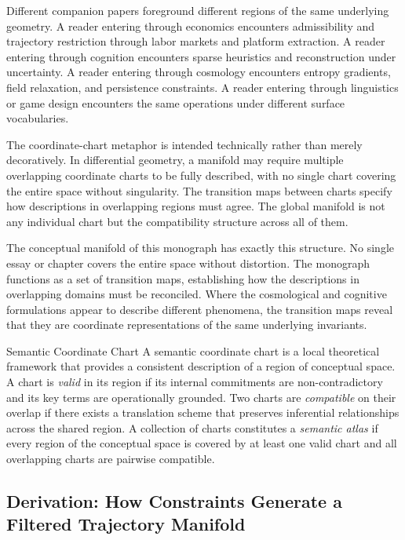 Different companion papers foreground different regions of the same underlying geometry.
A reader entering through economics encounters admissibility and trajectory restriction
through labor markets and platform extraction. A reader entering through cognition
encounters sparse heuristics and reconstruction under uncertainty. A reader entering
through cosmology encounters entropy gradients, field relaxation, and persistence
constraints. A reader entering through linguistics or game design encounters the same
operations under different surface vocabularies.

The coordinate-chart metaphor is intended technically rather than merely decoratively.
In differential geometry, a manifold may require multiple overlapping coordinate charts
to be fully described, with no single chart covering the entire space without singularity.
The transition maps between charts specify how descriptions in overlapping regions must
agree. The global manifold is not any individual chart but the compatibility structure
across all of them.

The conceptual manifold of this monograph has exactly this structure. No single essay or
chapter covers the entire space without distortion. The monograph functions as a set of
transition maps, establishing how the descriptions in overlapping domains must be
reconciled. Where the cosmological and cognitive formulations appear to describe
different phenomena, the transition maps reveal that they are coordinate representations
of the same underlying invariants.

\begin{definition}{Semantic Coordinate Chart}
A semantic coordinate chart is a local theoretical framework that provides a consistent
description of a region of conceptual space. A chart is \emph{valid} in its region if
its internal commitments are non-contradictory and its key terms are operationally
grounded. Two charts are \emph{compatible} on their overlap if there exists a
translation scheme that preserves inferential relationships across the shared region.
A collection of charts constitutes a \emph{semantic atlas} if every region of the
conceptual space is covered by at least one valid chart and all overlapping charts are
pairwise compatible.
\end{definition}

\subsection*{Derivation: How Constraints Generate a Filtered Trajectory Manifold}

